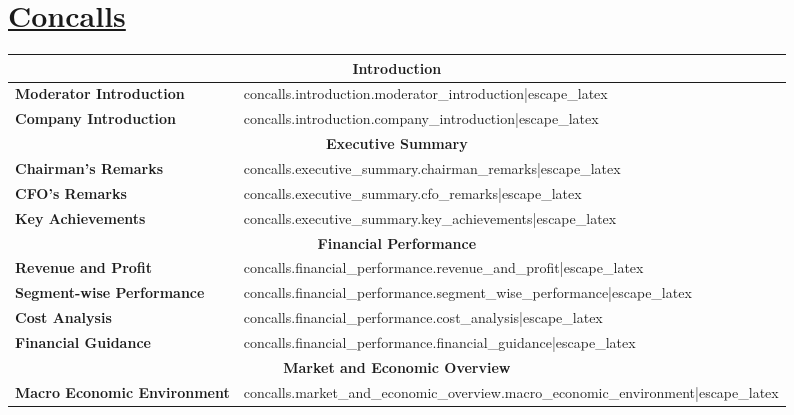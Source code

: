 \documentclass{article}
\begin{document}
    \section*{\underline{Concalls}}
    \begin{table}[H]
        \centering
        \begin{tabularx}{\textwidth}{|m{5cm}|>{\raggedright\arraybackslash}X|}
            \hline
            \multicolumn{2}{|c|}{\textbf{Introduction}} \\
            \hline
            \textbf{Moderator Introduction} & {{ concalls.introduction.moderator_introduction|escape_latex }} \\
            \hline
            \textbf{Company Introduction} & {{ concalls.introduction.company_introduction|escape_latex }} \\
            \hline
            \multicolumn{2}{|c|}{\textbf{Executive Summary}} \\
            \hline
            \textbf{Chairman's Remarks} & {{ concalls.executive_summary.chairman_remarks|escape_latex }} \\
            \hline
            \textbf{CFO's Remarks} & {{ concalls.executive_summary.cfo_remarks|escape_latex }} \\
            \hline
            \textbf{Key Achievements} & {{ concalls.executive_summary.key_achievements|escape_latex }} \\
            \hline
            \multicolumn{2}{|c|}{\textbf{Financial Performance}} \\
            \hline
            \textbf{Revenue and Profit} & {{ concalls.financial_performance.revenue_and_profit|escape_latex }} \\
            \hline
            \textbf{Segment-wise Performance} & {{ concalls.financial_performance.segment_wise_performance|escape_latex }} \\
            \hline
            \textbf{Cost Analysis} & {{ concalls.financial_performance.cost_analysis|escape_latex }} \\
            \hline
            \textbf{Financial Guidance} & {{ concalls.financial_performance.financial_guidance|escape_latex }} \\
            \hline
            \multicolumn{2}{|c|}{\textbf{Market and Economic Overview}} \\
            \hline
            \textbf{Macro Economic Environment} & {{ concalls.market_and_economic_overview.macro_economic_environment|escape_latex }} \\

\end{tabularx}
\end{table}
\end{document}
